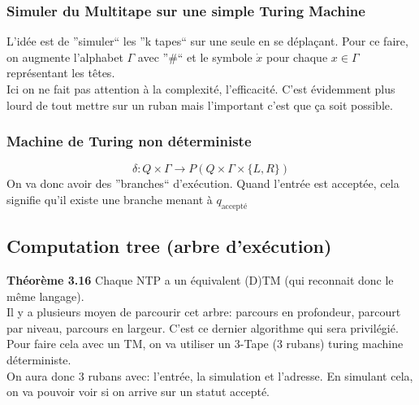 \documentclass[a4paper,12pt]{article}
\begin{document}
    \subsubsection{Simuler du Multitape sur une simple Turing Machine}
      L'idée est de ''simuler`` les ''k tapes`` sur une seule en se déplaçant. Pour ce faire, on augmente l'alphabet $\Gamma$ avec ''\#`` et le symbole $\dot{x}$ pour chaque $x \in \Gamma$ représentant les têtes.\\
      Ici on ne fait pas attention à la complexité, l'efficacité.  C'est évidemment plus lourd de tout mettre sur un ruban mais l'important c'est que ça soit possible.
      
    \subsubsection{Machine de Turing non déterministe}
      $$\delta : Q \times \Gamma \rightarrow P (Q \times \Gamma \times \{L, R\})$$
      On va donc avoir des ''branches`` d’exécution.  Quand l'entrée est acceptée, cela signifie qu'il existe une branche menant à $q_{\text{accepté}}$
    
  \subsection{Computation tree (arbre d'exécution)}
    \textbf{Théorème 3.16} Chaque NTP a un équivalent (D)TM (qui reconnait donc le même langage).\\
    Il y a plusieurs moyen de parcourir cet arbre: parcours en profondeur, parcourt par niveau, parcours en largeur.  C'est ce dernier algorithme qui sera privilégié.  Pour faire cela avec un TM, on va utiliser un 3-Tape (3 rubans) turing machine déterministe.\\
    On aura donc 3 rubans avec: l'entrée, la simulation et l'adresse.  En simulant cela, on va pouvoir voir si on arrive sur un statut accepté.
    
  
\end{document}
